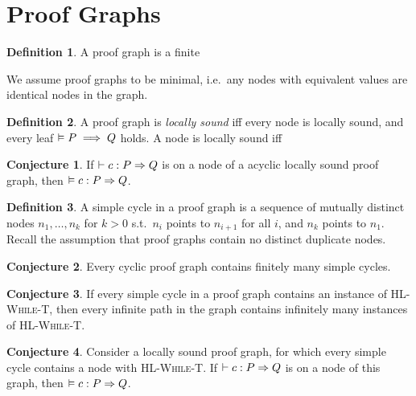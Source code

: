 \documentclass[10pt]{article}
\theoremstyle{definition}
\newtheorem{definition}{Definition}
\newtheorem{conjecture}{Conjecture}
\begin{document}
\section{Proof Graphs}

\begin{definition}
    A proof graph is a finite 

    We assume proof graphs to be minimal, i.e.\ any nodes with equivalent values
    are identical nodes in the graph.
\end{definition}

\begin{definition}
    A proof graph is \emph{locally sound} iff every node is locally sound,
    and every leaf $\vDash P \implies Q$ holds.
    A node is locally sound iff 
\end{definition}

\begin{conjecture}
    If $\DER \Triple c : P => Q$ is on a node of a
    acyclic locally sound proof graph,
    then $\VAL \Triple c : P => Q$.
\end{conjecture}

\begin{definition}
    A simple cycle in a proof graph is a sequence of mutually distinct nodes $n_1,\dots,n_k$ for $k > 0$
    s.t.\ $n_i$ points to $n_{i+1}$ for all $i$, and $n_k$ points to $n_1$.
    Recall the assumption that proof graphs contain no distinct duplicate nodes.
\end{definition}

\begin{conjecture}
    Every cyclic proof graph contains finitely many simple cycles.
\end{conjecture}


\begin{conjecture}
    If every simple cycle in a proof graph
    contains an instance of \textsc{HL-While-T},
    then every infinite path in the graph
    contains infinitely many instances of \textsc{HL-While-T}.
\end{conjecture}

\begin{conjecture}
    Consider a locally sound proof graph,
    for which every simple cycle contains a node
    with \textsc{HL-While-T}.
    If $\DER \Triple c : P => Q$ is on a node of this graph,
    then $\VAL \Triple c : P => Q$.
\end{conjecture}
\end{document}
